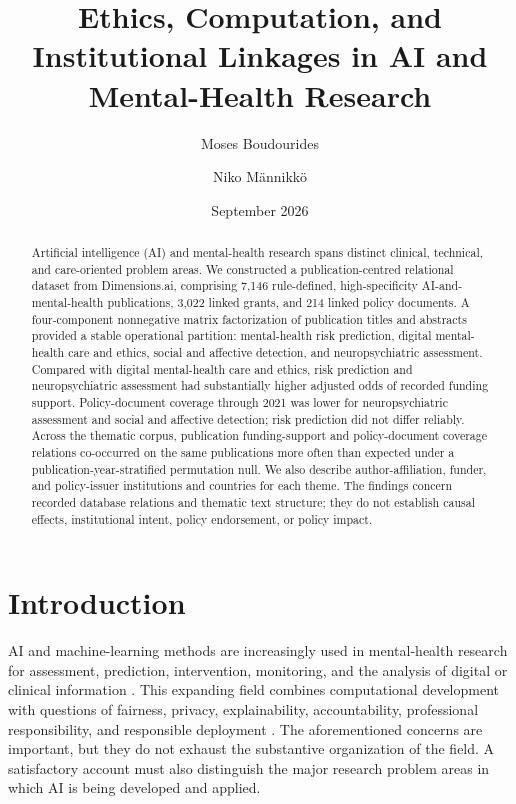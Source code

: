 \documentclass[12pt]{article}
\title{Ethics, Computation, and Institutional Linkages in AI and Mental-Health Research}
\author[1]{Moses Boudourides}
\author[2]{Niko M{\"a}nnikk{\"o}}
\affil[1]{School of Professional Studies, Northwestern University, Evanston, IL, USA%
\authorcr\texttt{Moses.Boudourides@northwestern.edu}}
\affil[2]{Centre for Research and Innovation, Oulu University of Applied Sciences, Finland%
\authorcr\texttt{mannikkon@gmail.com}}
\date{September 2026}
\begin{document}
\maketitle

\begin{abstract}
Artificial intelligence (AI) and mental-health research spans distinct clinical, technical, and care-oriented problem areas. We constructed a publication-centred relational dataset from Dimensions.ai, comprising 7,146 rule-defined, high-specificity AI-and-mental-health publications, 3,022 linked grants, and 214 linked policy documents. A four-component nonnegative matrix factorization of publication titles and abstracts provided a stable operational partition: mental-health risk prediction, digital mental-health care and ethics, social and affective detection, and neuropsychiatric assessment. Compared with digital mental-health care and ethics, risk prediction and neuropsychiatric assessment had substantially higher adjusted odds of recorded funding support. Policy-document coverage through 2021 was lower for neuropsychiatric assessment and social and affective detection; risk prediction did not differ reliably. Across the thematic corpus, publication funding-support and policy-document coverage relations co-occurred on the same publications more often than expected under a publication-year-stratified permutation null. We also describe author-affiliation, funder, and policy-issuer institutions and countries for each theme. The findings concern recorded database relations and thematic text structure; they do not establish causal effects, institutional intent, policy endorsement, or policy impact.
\end{abstract}

\section{Introduction}

AI and machine-learning methods are increasingly used in mental-health research for assessment, prediction, intervention, monitoring, and the analysis of digital or clinical information \citep{straw2020artificial,beg2025,raygozal2025}. This expanding field combines computational development with questions of fairness, privacy, explainability, accountability, professional responsibility, and responsible deployment \citep{bansal2026,carneiro2025,pardo2026}. The aforementioned concerns are important, but they do not exhaust the substantive organization of the field. A satisfactory account must also distinguish the major research problem areas in which AI is being developed and applied.
\end{document}
